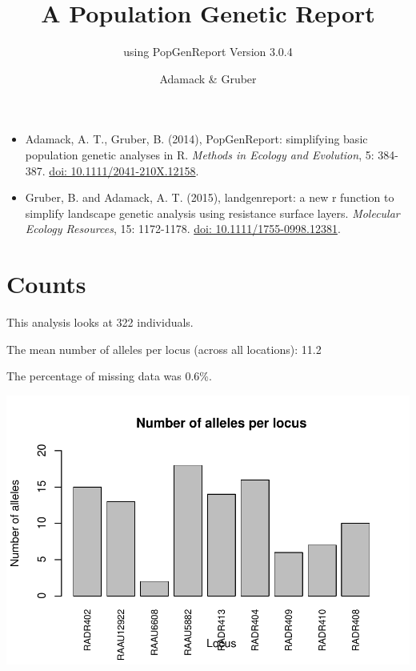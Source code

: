 \documentclass[a4paper]{scrartcl}\usepackage[]{graphicx}\usepackage[]{color}
\makeatletter
\def\maxwidth{ %
  \ifdim\Gin@nat@width>\linewidth
    \linewidth
  \else
    \Gin@nat@width
  \fi
}
\newenvironment{knitrout}{}{} %
\makeatother
\begin{document}
\title{A Population Genetic Report}


\subtitle {using PopGenReport Version  3.0.4 }

\author{Adamack \& Gruber}
\maketitle

\begin{itemize}
  \item Adamack, A. T., Gruber, B. (2014), PopGenReport: simplifying basic population genetic analyses in R. \emph{Methods in Ecology and Evolution}, 5: 384-387. \href{http://onlinelibrary.wiley.com/doi/10.1111/2041-210X.12158/full}{doi: 10.1111/2041-210X.12158}.
  \item Gruber, B. and Adamack, A. T. (2015), landgenreport: a new r function to simplify landscape genetic analysis using resistance surface layers. \emph{Molecular Ecology Resources}, 15: 1172-1178. \href{http://onlinelibrary.wiley.com/doi/10.1111/1755-0998.12381/full}{doi: 10.1111/1755-0998.12381}.
\end{itemize}


  

\tableofcontents
\newpage


\section{Counts}
This analysis looks at 322 individuals.

\noindent
\newline The mean number of alleles per locus (across all locations): 11.2


\noindent
\newline The percentage of missing data was 0.6\%.

\begin{knitrout}
\color{fgcolor}
\includegraphics[width=\maxwidth]{PopGenReport-n_alleles_per_locus-1} 
\end{knitrout}
\FloatBarrier
\end{document}
